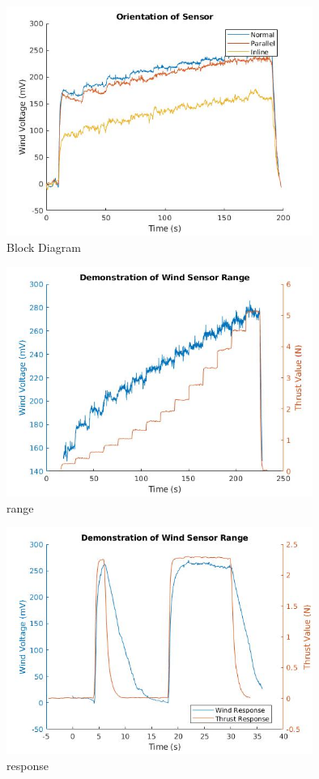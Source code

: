\documentclass[conference]{IEEEtran}
\begin{document}
	\begin{figure}[htbp]
	\includegraphics[width=10cm]{images/figure_1/orientation.jpg}
	\caption{Block Diagram}
	\label{orientation}
\end{figure}
	\begin{figure}[htbp]
	\includegraphics[width=10cm]{images/figure_1/range.jpg}
	\caption{range}
	\label{range}
\end{figure}
	\begin{figure}[htbp]
	\includegraphics[width=10cm]{images/figure_1/response.jpg}
	\caption{response}
	\label{response}
\end{figure}
\end{document}
